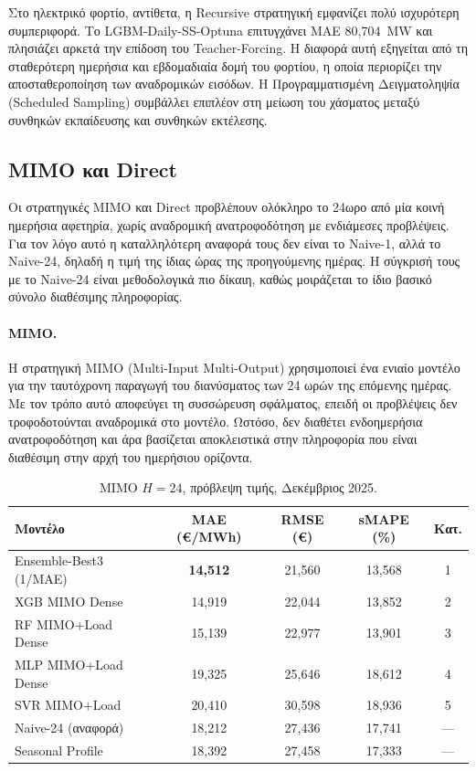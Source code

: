 Στο ηλεκτρικό φορτίο, αντίθετα, η Recursive στρατηγική εμφανίζει πολύ ισχυρότερη
συμπεριφορά. Το LGBM-Daily-SS-Optuna επιτυγχάνει MAE 80,704~MW και πλησιάζει αρκετά
την επίδοση του Teacher-Forcing. Η διαφορά αυτή εξηγείται από τη σταθερότερη ημερήσια
και εβδομαδιαία δομή του φορτίου, η οποία περιορίζει την αποσταθεροποίηση των
αναδρομικών εισόδων. Η Προγραμματισμένη Δειγματοληψία (Scheduled Sampling) συμβάλλει
επιπλέον στη μείωση του χάσματος μεταξύ συνθηκών εκπαίδευσης και συνθηκών εκτέλεσης.

\subsection{MIMO και Direct}
\label{subsec:mimo_direct_static_dec}

Οι στρατηγικές MIMO και Direct προβλέπουν ολόκληρο το 24ωρο από μία κοινή ημερήσια
αφετηρία, χωρίς αναδρομική ανατροφοδότηση με ενδιάμεσες προβλέψεις. Για τον λόγο αυτό
η καταλληλότερη αναφορά τους δεν είναι το Naive-1, αλλά το Naive-24, δηλαδή η τιμή της
ίδιας ώρας της προηγούμενης ημέρας. Η σύγκρισή τους με το Naive-24 είναι μεθοδολογικά
πιο δίκαιη, καθώς μοιράζεται το ίδιο βασικό σύνολο διαθέσιμης πληροφορίας.

\paragraph{MIMO.}
Η στρατηγική MIMO (Multi-Input Multi-Output) χρησιμοποιεί ένα ενιαίο μοντέλο για την
ταυτόχρονη παραγωγή του διανύσματος των 24 ωρών της επόμενης ημέρας. Με τον τρόπο
αυτό αποφεύγει τη συσσώρευση σφάλματος, επειδή οι προβλέψεις δεν τροφοδοτούνται
αναδρομικά στο μοντέλο. Ωστόσο, δεν διαθέτει ενδοημερήσια ανατροφοδότηση και άρα
βασίζεται αποκλειστικά στην πληροφορία που είναι διαθέσιμη στην αρχή του ημερήσιου
ορίζοντα.

\begin{table}[H]
  \centering
  \caption{MIMO $H=24$, πρόβλεψη τιμής, Δεκέμβριος 2025.}
  \label{tab:mimo_price_dec}
  \begin{tabular}{lcccc}
    \toprule
    \textbf{Μοντέλο} & \textbf{MAE (€/MWh)} & \textbf{RMSE (€)} & \textbf{sMAPE (\%)} & \textbf{Κατ.} \\
    \midrule
    Ensemble-Best3 (1/MAE) & \textbf{14,512} & 21,560 & 13,568 & 1 \\
    XGB MIMO Dense         & 14,919 & 22,044 & 13,852 & 2 \\
    RF MIMO+Load Dense     & 15,139 & 22,977 & 13,901 & 3 \\
    MLP MIMO+Load Dense    & 19,325 & 25,646 & 18,612 & 4 \\
    SVR MIMO+Load          & 20,410 & 30,598 & 18,936 & 5 \\
    \midrule
    Naive-24 (αναφορά)     & 18,212 & 27,436 & 17,741 & --- \\
    Seasonal Profile       & 18,392 & 27,458 & 17,333 & --- \\
    \bottomrule
  \end{tabular}
\end{table}

